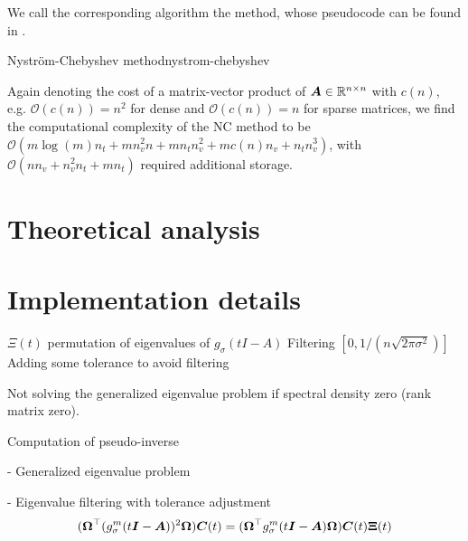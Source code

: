 We call the corresponding algorithm the  method, whose pseudocode
can be found in .
\begin{algo}{Nystr\"om-Chebyshev method}{nystrom-chebyshev}
    
\end{algo}

Again denoting the cost of a matrix-vector product of $\boldsymbol{A} \in \mathbb{R}^{n \times n}$
with $c(n)$, e.g. $\mathcal{O}(c(n)) = n^2$ for dense and $\mathcal{O}(c(n)) = n$
for sparse matrices, we find the computational complexity of the \gls{NC}
method to be $\mathcal{O}(m \log(m) n_t + m n_v^2 n + m n_t n_v^2 +  m c(n) n_v + n_t n_v^3)$, with
$\mathcal{O}(n n_v + n_v^2 n_t + m n_t)$ required additional storage.


\section{Theoretical analysis}
\label{sec:3-nystrom-theoretical-analysis}



\section{Implementation details}
\label{sec:3-nystrom-implementation-details}

$\Xi(t)$ permutation of eigenvalues of $g_{\sigma}(tI - A)$
Filtering $[0, 1 / (n \sqrt{2 \pi \sigma^2})]$ \cite{lin2017randomized}
Adding some tolerance to avoid filtering

Not solving the generalized eigenvalue problem if spectral density zero (rank matrix zero).

Computation of pseudo-inverse

- Generalized eigenvalue problem

- Eigenvalue filtering with tolerance adjustment
\begin{equation}
    (\boldsymbol{\Omega}^{\top} (g_{\sigma}^m(t\boldsymbol{I} - \boldsymbol{A}))^2 \boldsymbol{\Omega}) \boldsymbol{C}(t) = (\boldsymbol{\Omega}^{\top} g_{\sigma}^m(t\boldsymbol{I} - \boldsymbol{A}) \boldsymbol{\Omega}) \boldsymbol{C}(t) \boldsymbol{\Xi}(t)
    \label{equ:3-nystrom-generalized-eigenproblem}
\end{equation}

